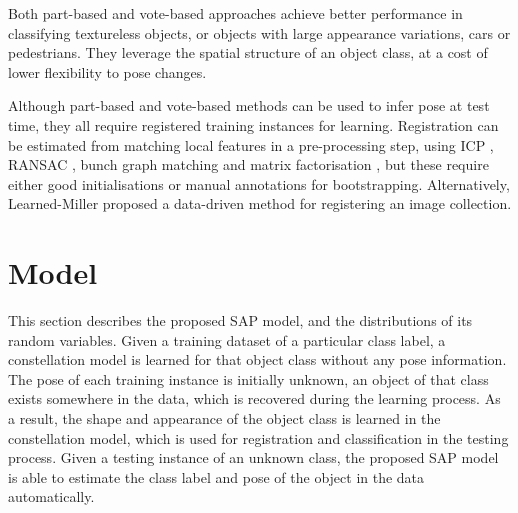 Both part-based and vote-based approaches achieve better performance in classifying textureless objects, or objects with large appearance variations, \eg cars or pedestrians. They leverage the spatial structure of an object class, at a cost of lower flexibility to pose changes.  





Although part-based and vote-based methods can be used to infer pose at test time, they all require registered training instances for learning.  
Registration can be estimated from matching local features in a pre-processing step, using ICP \cite{Pham2011}, RANSAC \cite{Moreels2007}, bunch graph matching \cite{Wiskott1997} and matrix factorisation \cite{Arie-Nachimson2009}, but these require either good initialisations or manual annotations for bootstrapping. Alternatively, Learned-Miller \cite{Learned-Miller2006} proposed a data-driven method for registering an image collection.  

\section{Model}
\label{sec/reg/framework}

This section describes the proposed SAP model, and the distributions of its random variables.
Given a training dataset of a particular class label, a constellation model is learned for that object class without any pose information. The pose of each training instance is initially unknown, \ie an object of that class exists somewhere in the data, which is recovered during the learning process. 
As a result, the shape and appearance of the object class is learned in the constellation model, which is used for registration and classification in the testing process. 
Given a testing instance of an unknown class, the proposed SAP model is able to estimate the class label and pose of the object in the data automatically.

